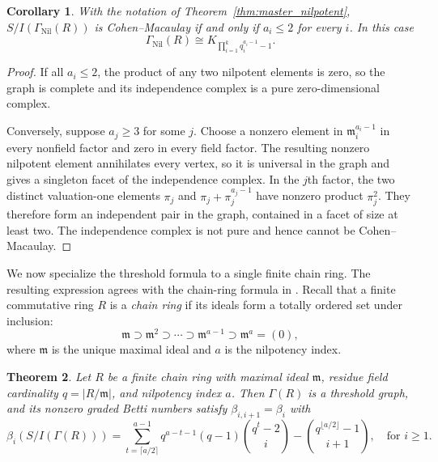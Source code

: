 \documentclass[12pt, reqno]{amsart}
\newtheorem{theorem}{Theorem}[section]
\newtheorem{corollary}[theorem]{Corollary}
\theoremstyle{definition}
\numberwithin{equation}{section}
\begin{document}
\begin{corollary}\label{cor:nil_cm_exact}
With the notation of Theorem~\ref{thm:master_nilpotent}, $S/I(\Gamma_{\operatorname{Nil}}(R))$ is Cohen--Macaulay if and only if $a_i\le2$ for every $i$.  In this case
\[
\Gamma_{\operatorname{Nil}}(R)
\cong
K_{\prod_{i=1}^{k}q_i^{a_i-1}-1}.
\]
\end{corollary}
\begin{proof}
If all $a_i\le2$, the product of any two nilpotent elements is zero, so the graph is complete and its independence complex is a pure zero-dimensional complex.

Conversely, suppose $a_j\ge3$ for some $j$.  Choose a nonzero element in $\mathfrak m_i^{a_i-1}$ in every nonfield factor and zero in every field factor.  The resulting nonzero nilpotent element annihilates every vertex, so it is universal in the graph and gives a singleton facet of the independence complex.  In the $j$th factor, the two distinct valuation-one elements $\pi_j$ and $\pi_j+\pi_j^{a_j-1}$ have nonzero product $\pi_j^2$.  They therefore form an independent pair in the graph, contained in a facet of size at least two.  The independence complex is not pure and hence cannot be Cohen--Macaulay.
\end{proof}
	
	We now specialize the threshold formula to a single finite chain ring.  The resulting expression agrees with the chain-ring formula in \cite{rather2026}. Recall that a finite commutative ring $R$ is a \emph{chain ring} if its ideals form a totally ordered set under inclusion:
	\[
	\mathfrak m \supset \mathfrak m^2 \supset \cdots \supset \mathfrak m^{a-1} \supset \mathfrak m^a=(0),
	\]
	where $\mathfrak m$ is the unique maximal ideal and $a$ is the nilpotency index.
	
	\begin{theorem}\label{thm:chain_rings}
		Let $R$ be a finite chain ring with maximal ideal $\mathfrak{m}$, residue field cardinality $q = |R/\mathfrak{m}|$, and nilpotency index $a$. Then $\Gamma(R)$ is a threshold graph, and its nonzero graded Betti numbers satisfy $\beta_{i,i+1}=\beta_i$ with
		\[
		\beta_i(S/I(\Gamma(R))) = \sum_{t=\lceil a/2\rceil}^{a-1} q^{a-t-1}(q-1) \binom{q^t - 2}{i} - \binom{q^{\lfloor a/2\rfloor} - 1}{i+1}, \quad \text{for } i \ge1.
		\]
	\end{theorem}
	
\end{document}
